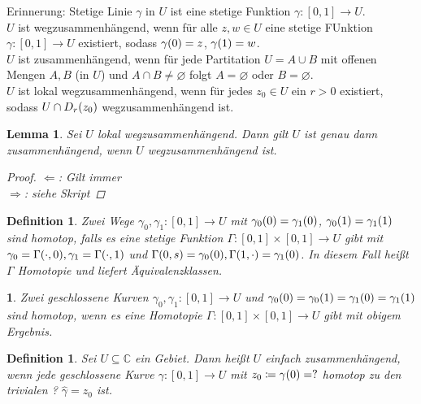 \documentclass[11pt, a4paper]{article}
\theoremstyle{plain}
\newtheorem{definition}[blockelement]{Definition}
\newtheorem{lemma}[blockelement]{Lemma}
\newtheorem{genv}[blockelement]{}
\numberwithin{equation}{subsection}
\newcommand{\of}[1]{\mathopen{}\mathclose{}\bgroup\left(#1\aftergroup\egroup\right)}
\newcommand{\interv}[1]{\left[#1\right]}
\newcommand{\impl}[0]{\Rightarrow{}}
\renewcommand{\emptyset}{\varnothing}
\newcommand{\anf}[1]{\glqq{}#1\grqq}
\newcommand{\C}{\mathbb{C}}
\begin{document}
    Erinnerung: Stetige Linie $\gamma$ in $U$ ist eine stetige Funktion $\gamma: \interv{0,1}\to U$.\\
    $U$ ist wegzusammenhängend, wenn für alle $z, w\in U$ eine stetige FUnktion $\gamma: \interv{0,1} \to U$ existiert, sodass $\gamma\of{0} = z$, $\gamma\of{1} = w$.\\
    $U$ ist zusammenhängend, wenn für jede Partitation $U = A \cup B$ mit offenen Mengen $A, B$ (in $U$) und $A \cap B \neq \emptyset$ folgt $A = \emptyset$ oder $B = \emptyset$.\\
    $U$ ist lokal wegzusammenhängend, wenn für jedes $z_0\in U$ ein $r > 0$ existiert, sodass $U\cap D_r\of{z_0}$ wegzusammenhängend ist.

    \begin{lemma}
        Sei $U$ lokal wegzusammenhängend. Dann gilt $U$ ist genau dann zusammenhängend, wenn $U$ wegzusammenhängend ist.

        \begin{proof}
            \anf{$\Leftarrow$}: Gilt immer\\
            \anf{$\impl$}: siehe Skript
        \end{proof}
    \end{lemma}

    \begin{definition}
        Zwei Wege $\gamma_0, \gamma_1: \interv{0,1}\to U$ mit $\gamma_0\of{0} = \gamma_1\of{0}$, $\gamma_0\of{1} = \gamma_1\of{1}$ sind homotop, falls es eine stetige Funktion $\Gamma: \interv{0,1} \times \interv{0,1}\to U$ gibt mit $\gamma_0 = \Gamma\of{\cdot, 0}, \gamma_1 = \Gamma\of{\cdot, 1}$ und $\Gamma\of{0, s} = \gamma_0\of{0}, \Gamma\of{1, \cdot} = \gamma_1\of{0}$. In diesem Fall heißt $\Gamma$ Homotopie und liefert Äquivalenzklassen.
    \end{definition}

    \begin{genv}
        Zwei geschlossene Kurven $\gamma_0, \gamma_1: \interv{0,1}\to U$ und $\gamma_0\of{0} = \gamma_0\of{1} = \gamma_1\of{0} = \gamma_1\of{1}$ sind homotop, wenn es eine Homotopie $\Gamma: \interv{0,1}\times\interv{0,1}\to U$ gibt mit obigem Ergebnis.
    \end{genv}

    \begin{definition}
        Sei $U\subseteq\C$ ein Gebiet. Dann heißt $U$ einfach zusammenhängend, wenn jede geschlossene Kurve $\gamma:\interv{0,1}\to U$ mit $z_0 \coloneqq \gamma\of{0} = ?$ homotop zu den trivialen ? $\hat{\gamma} = z_0$ ist.
    \end{definition}
\end{document}

